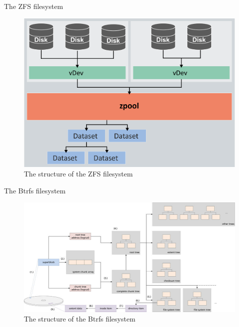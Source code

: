 \documentclass[xcolor=table]{beamer}
\begin{document}
	\begin{frame}{The ZFS filesystem}
		\begin{figure}
			\centering

			\includegraphics[width=\textwidth]{media/zfs.png}
			\caption{The structure of the ZFS filesystem }
			\label{fig:zfs}
		\end{figure}
		
	\end{frame}

	\begin{frame}{The Btrfs filesystem}
		\begin{figure}
			\centering

			\includegraphics[width=\textwidth]{media/btrfs.png}
			\caption{The structure of the Btrfs filesystem }
			\label{fig:btrfs}
		\end{figure}
			
	\end{frame}
\end{document}
